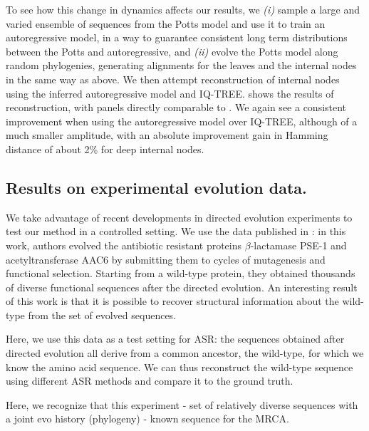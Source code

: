 To see how this change in dynamics affects our results, we \emph{(i)} sample a large and varied ensemble of sequences from the Potts model and use it to train an autoregressive model, in a way to guarantee consistent long term distributions between the Potts and autoregressive, and \emph{(ii)} evolve the Potts model along random phylogenies, generating alignments for the leaves and the internal nodes in the same way as above. 
We then attempt reconstruction of internal nodes using the inferred autoregressive model and IQ-TREE.
 shows the results of reconstruction, with panels directly comparable to . 
We again see a consistent improvement when using the autoregressive model over IQ-TREE, although of a much smaller amplitude, with an absolute improvement gain in Hamming distance of about 2\% for deep internal nodes.


\subsection{Results on experimental evolution data.}

We take advantage of recent developments in directed evolution experiments to test our method in a controlled setting. 
We use the data published in \cite{stiffler_proteinstructureexperimental_2020}: in this work, authors evolved the antibiotic resistant proteins $\beta$-lactamase PSE-1 and acetyltransferase AAC6 by submitting them to  cycles of mutagenesis and functional selection. 
Starting from a wild-type protein, they obtained thousands of diverse functional sequences after the directed evolution. 
An interesting result of this work is that it is possible to recover structural information about the wild-type from the set of evolved sequences. 

Here, we use this data as a test setting for ASR: the sequences obtained after directed evolution all derive from a common ancestor, the wild-type, for which we know the amino acid sequence. 
We can thus reconstruct the wild-type sequence using different ASR methods and compare it to the ground truth. 

Here, we recognize that this experiment 
- set of relatively diverse sequences with a joint evo history (phylogeny)
- known sequence for the MRCA. 




